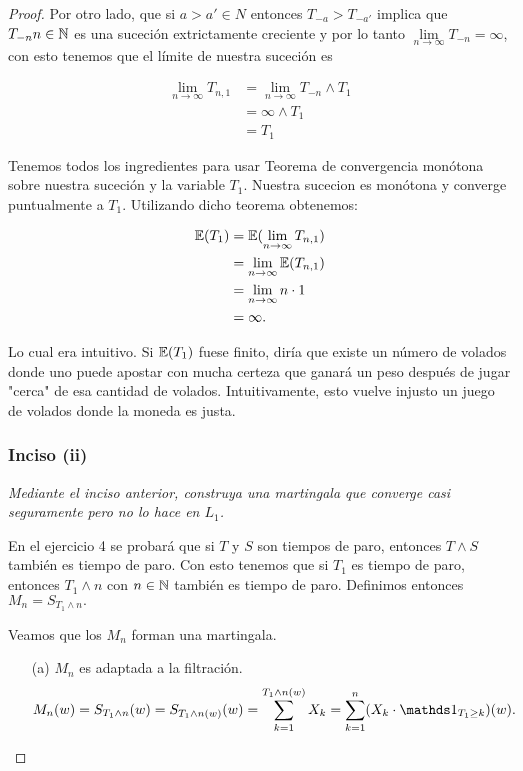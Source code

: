 \begin{proof}
		Por otro lado, que si $a>a' \in N$ entonces $T_{-a} > T_{-a'}$ implica que $T_{-n} n \in \mathbb{N}$ es 
		una suceción extrictamente creciente y por lo tanto 
		$\lim\limits_{n \rightarrow \infty} T_{-n} = \infty$, con esto tenemos que el límite de nuestra 
		suceción es 
		
		\begin{align}		
			\lim_{n\rightarrow\infty} T_{n,1} 	&=	\lim_{n\rightarrow\infty} T_{-n} \wedge T_1 \\
												&=	\infty \wedge T_1 \\
												&=	T_1
		\end{align}

		Tenemos todos los ingredientes para usar Teorema de convergencia monótona sobre nuestra suceción
		y la variable $T_1$. Nuestra sucecion es monótona y converge puntualmente a $T_1$. Utilizando
		dicho teorema obtenemos:
		
		\begin{align}
			\mathbb{E}(T_1) 	&=		\mathbb{E}(\lim_{n\rightarrow\infty} T_{n,1}) \\ 
						&= 		\lim_{n\rightarrow\infty} \mathbb{E}(T_{n,1}) \\
						&=		\lim_{n\rightarrow\infty} n\cdot 1 \\
						&=		\infty.
		\end{align}
		
		Lo cual era intuitivo. Si $\mathbb{E}(T_1)$ fuese finito, diría que existe un número de volados donde
		uno puede apostar con mucha certeza que ganará un peso después de jugar "cerca" de esa cantidad
		de volados. Intuitivamente, esto vuelve injusto un juego de volados donde la moneda es
		justa.\\
		
	\subsubsection{Inciso (ii)}
	\emph
	{	
		Mediante el inciso anterior, construya una martingala que converge 
		casi seguramente pero no lo hace en $L_1$.\\
	}
		
		En el ejercicio 4 se probará que si $T$ y $S$ son tiempos de paro, entonces $T\wedge S$ también 
		es tiempo de paro. Con esto tenemos que si $T_1$ es tiempo de paro, entonces $T_1 \wedge n$ con 
		$n \in \mathbb{N}$ también es tiempo de paro. Definimos entonces $M_n = S_{T_1 \wedge n}.$
		
		Veamos que los $M_n$ forman una martingala.
		
		\begin{itemize}
			\item[(a)] 
				$M_n$ es adaptada a la filtración.
				\begin{align}
					M_n(w) = S_{T_1 \wedge n}(w) = 
					S_{T_1 \wedge n (w)}(w) = 
					\sum_{k=1}^{T_1 \wedge n (w)} X_k = 
					\sum_{k=1}^{n} (X_k \cdot \indic_{T_1 \geq k})(w).
				\end{align}
				

\end{itemize}
\end{proof}
